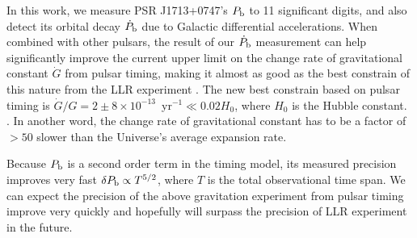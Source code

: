 In this work, we measure PSR J1713+0747's $P_{\rm b}$ to 11 significant
digits, and also detect its orbital decay $\dot{P}_{\rm b}$ due to Galactic differential accelerations.
When combined with other pulsars, the result of our $\dot{P}_{\rm b}$
measurement can help
significantly improve the current upper limit on the change rate of gravitational
 constant $\dot{G}$ from pulsar timing, making it almost as good as the best
constrain of this nature from the LLR experiment \citep{hmb10}.
The new best constrain based on pulsar timing is $\dot{G}/G
=2\pm8\times10^{-13}$~yr$^{-1}\ll0.02H_0$, where $H_0$ is the Hubble constant. . 
In another word, the change rate of gravitational constant has to be a factor of $>50$
slower than the Universe's average expansion rate.

Because $P_{\rm b}$ is a second order term in the timing 
model, its measured precision improves very fast $\delta
P_{\rm b} \propto T^{5/2}$, where $T$ is the total observational time span.
We can expect the precision of the above gravitation experiment from pulsar
timing improve very quickly and hopefully will surpass the precision of LLR
experiment in the future.
